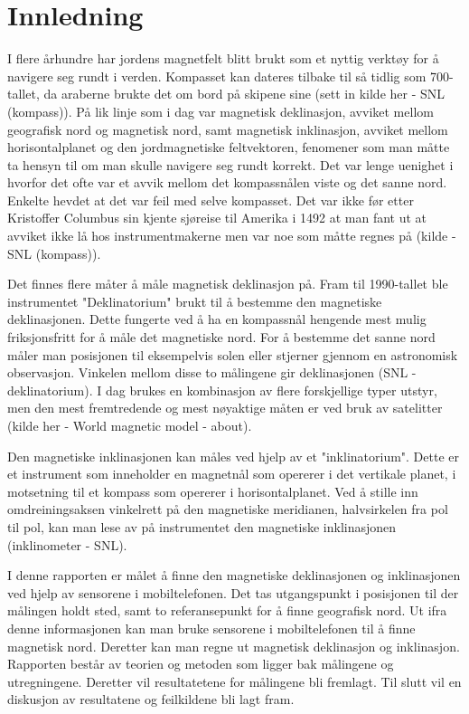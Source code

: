 \section{Innledning}

I flere århundre har jordens magnetfelt blitt brukt som et nyttig verktøy for å navigere seg rundt i verden. Kompasset kan dateres tilbake til så tidlig som 700-tallet, da araberne brukte det om bord på skipene sine (sett in kilde her - SNL (kompass)). På lik linje som i dag var magnetisk deklinasjon, avviket mellom geografisk nord og magnetisk nord, samt magnetisk inklinasjon, avviket mellom horisontalplanet og den jordmagnetiske feltvektoren, fenomener som man måtte ta hensyn til om man skulle navigere seg rundt korrekt. Det var lenge uenighet i hvorfor det ofte var et avvik mellom det kompassnålen viste og det sanne nord. Enkelte hevdet at det var feil med selve kompasset. Det var ikke før etter Kristoffer Columbus sin kjente sjøreise til Amerika i 1492 at man fant ut at avviket ikke lå hos instrumentmakerne men var noe som måtte regnes på (kilde - SNL (kompass)). 

Det finnes flere måter å måle magnetisk deklinasjon på. Fram til 1990-tallet ble instrumentet "Deklinatorium" brukt til å bestemme den magnetiske deklinasjonen. Dette fungerte ved å ha en kompassnål hengende mest mulig friksjonsfritt for å måle det magnetiske nord. For å bestemme det sanne nord måler man posisjonen til eksempelvis solen eller stjerner gjennom en astronomisk observasjon. Vinkelen mellom disse to målingene gir deklinasjonen (SNL - deklinatorium). I dag brukes en kombinasjon av flere forskjellige typer utstyr, men den mest fremtredende og mest nøyaktige måten er ved bruk av satelitter (kilde her - World magnetic model - about).    

Den magnetiske inklinasjonen kan måles ved hjelp av et "inklinatorium". Dette er et instrument som inneholder en magnetnål som opererer i det vertikale planet, i motsetning til et kompass som opererer i horisontalplanet. Ved å stille inn omdreiningsaksen vinkelrett på den magnetiske meridianen, halvsirkelen fra pol til pol, kan man lese av på instrumentet den magnetiske inklinasjonen (inklinometer - SNL). 

I denne rapporten er målet å finne den magnetiske deklinasjonen og inklinasjonen ved hjelp av sensorene i mobiltelefonen. Det tas utgangspunkt i posisjonen til der målingen holdt sted, samt to referansepunkt for å finne geografisk nord. Ut ifra denne informasjonen kan man bruke sensorene i mobiltelefonen til å finne magnetisk nord. Deretter kan man regne ut magnetisk deklinasjon og inklinasjon. Rapporten består av teorien og metoden som ligger bak målingene og utregningene. Deretter vil resultatetene for målingene bli fremlagt. Til slutt vil en diskusjon av resultatene og feilkildene bli lagt fram.